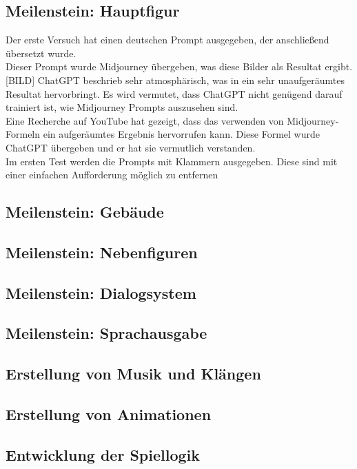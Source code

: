 \documentclass[12pt,a4paper,bibliography=totocnumbered,listof=totocnumbered]{scrartcl}
\begin{document}
\subsection {Meilenstein: Hauptfigur}
Der erste Versuch hat einen deutschen Prompt ausgegeben, der anschließend übersetzt wurde.
\\
Dieser Prompt wurde Midjourney übergeben, was diese Bilder als Resultat ergibt.
[BILD]
ChatGPT beschrieb sehr atmosphärisch, was in ein sehr unaufgeräumtes Resultat hervorbringt.
 Es wird vermutet, dass ChatGPT nicht genügend darauf trainiert ist, wie Midjourney Prompts auszusehen sind.
\\
Eine Recherche auf YouTube hat gezeigt, dass das verwenden von Midjourney-Formeln ein aufgeräumtes Ergebnis hervorrufen kann. Diese Formel wurde ChatGPT übergeben und er hat sie vermutlich verstanden.
\\
Im ersten Test werden die Prompts mit Klammern ausgegeben. Diese sind mit einer einfachen Aufforderung möglich zu entfernen

\subsection {Meilenstein: Gebäude}
\subsection {Meilenstein: Nebenfiguren}
\subsection {Meilenstein: Dialogsystem}
\subsection {Meilenstein: Sprachausgabe}

\subsection{Erstellung von Musik und Klängen}
\subsection{Erstellung von Animationen}
\subsection{Entwicklung der Spiellogik}
\end{document}
